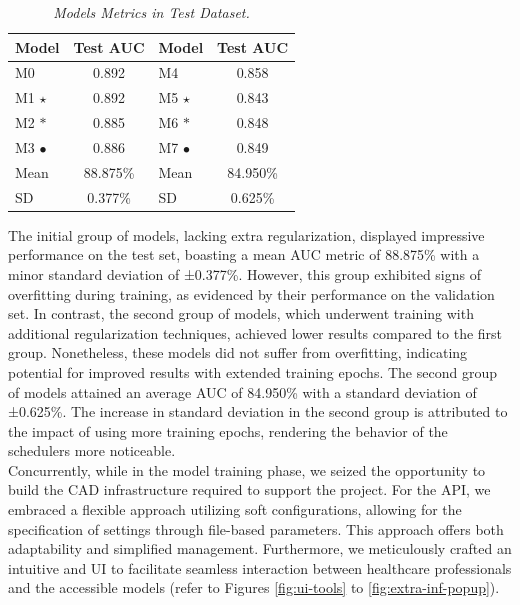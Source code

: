 \begin{table}[H]
\centering
\begin{tabular}{lc|lc}
    \toprule
  \textbf{Model} & \textbf{Test AUC} & \cellcolor{gray!50}\textbf{Model} & \cellcolor{gray!50}\textbf{Test AUC}  \\
\midrule
 M0 & 0.892 & \cellcolor{gray!50}M4 & \cellcolor{gray!50}0.858 \\
 M1 $\star$ & 0.892 & \cellcolor{gray!50}M5 $\star$ & \cellcolor{gray!50}0.843 \\
 M2 $\ast$ &  0.885 &  \cellcolor{gray!50}M6 $\ast$ & \cellcolor{gray!50}0.848 \\
 M3 $\bullet$ & 0.886 & \cellcolor{gray!50}M7 $\bullet$ & \cellcolor{gray!50}0.849 \\
 \midrule
Mean &  88.875\% & \cellcolor{gray!50}Mean & \cellcolor{gray!50}84.950\%  \\
SD &  0.377\%  &   \cellcolor{gray!50}SD &  \cellcolor{gray!50}0.625\%  \\

\bottomrule
\end{tabular}
\caption[Models Metrics in Test Dataset]
  {\textit{Models Metrics in Test Dataset.}}
{\label{table:test-set-resume-metrics}}
\end{table}

The initial group of models, lacking extra regularization, displayed impressive
performance on the test set, boasting a mean AUC metric of 88.875\% with a minor
standard deviation of ±0.377\%. However, this group exhibited signs of
overfitting during training, as evidenced by their performance on the
validation set. In contrast, the second group of models, which underwent
training with additional regularization techniques, achieved lower results
compared to the first group. Nonetheless, these models did not suffer from
overfitting, indicating potential for improved results with extended training
epochs. The second group of models attained an average AUC of 84.950\% with a
standard deviation of ±0.625\%. The increase in standard deviation in the second
group is attributed to the impact of using more training epochs, rendering the
behavior of the schedulers more noticeable. \\

Concurrently, while in the model training phase, we seized the opportunity to
build the CAD infrastructure required to support the project. For
the API, we embraced a flexible approach utilizing soft configurations,
allowing for the specification of settings through file-based parameters. This
approach offers both adaptability and simplified management. Furthermore, we
meticulously crafted an intuitive and UI to
facilitate seamless interaction between healthcare professionals and the
accessible models (refer to Figures \ref{fig:ui-tools} to \ref{fig:extra-inf-popup}). \\


